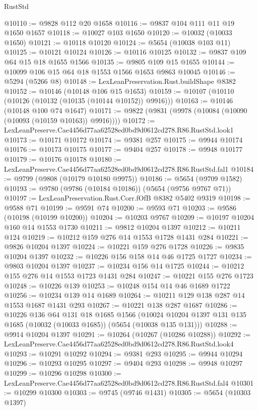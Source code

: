 \begin{lexlean}{RustStd}
\begin{coremodule}
@10110 := @9828 @112 @20 @1658
@10116 := @9837 @104 @111 @11 @19 @1650 @1657
@10118 := @10027 @103 @1650
@10120 := @10032 (@10033 @1650)
@10121 := @10118 @10120
@10124 := @5654 (@10038 @103 @11)
@10125 := @10121 @10124
@10126 := @10116 @10125
@10132 := @9837 @109 @64 @15 @18 @1655 @1566
@10135 := @9805 @109 @15 @1655
@10144 := @10099 @106 @15 @64 @18 @1553 @1566 @1653 @9863 @10045
@10146 := @5294 (@5266 @8)
@10148 := LexLeanPreservation.Rust.buildShape @8382
@10152 := @10146 (@10148 @106 @15 @1653)
@10159 := @10107 (@10110 (@10126 (@10132 (@10135 (@10144 @10152)) @9916)))
@10163 := @10146 (@10148 @100 @74 @1647)
@10171 := @9822 (@9831 (@9978 (@10084 (@10090 (@10093 (@10159 @10163)) @9916))))
@10172 := LexLeanPreserve.Cae4456d77aa62528ed0bd9d0612cd278.R86.RustStd.look1
@10173 := @10171 @10172
@10174 := @9381 @257
@10175 := @9944 @10174
@10176 := @10173 @10175
@10177 := @9404 @257
@10178 := @9948 @10177
@10179 := @10176 @10178
@10180 := LexLeanPreserve.Cae4456d77aa62528ed0bd9d0612cd278.R86.RustStd.fal1
@10184 := @9799 (@9808 (@10179 @10180 @9975))
@10186 := @5654 (@9709 @1582)
@10193 := @9780 (@9786 (@10184 @10186)) (@5654 (@9756 @9767 @71))
@10197 := LexLeanPreservation.Rust.Corr.fOfB @8382 @5402 @9319
@10198 := @9588 @71
@10199 := @9591 @74
@10200 := @9593 @71
@10203 := @9586 (@10198 (@10199 @10200))
@10204 := @10203 @9767
@10209 := @10197 @10204 @160 @14 @1553 @1730
@10211 := @9812 @10204 @1397
@10212 := @10211 @124
@10219 := @10212 @159 @276 @14 @1553 @1728 @1431 @284
@10221 := @9826 @10204 @1397
@10224 := @10221 @159 @276 @1728
@10226 := @9835 @10204 @1397
@10232 := @10226 @156 @158 @14 @46 @1725 @1727
@10234 := @9803 @10204 @1397
@10237 := @10234 @156 @14 @1725
@10244 := @10212 @155 @276 @14 @1553 @1723 @1431 @284
@10247 := @10221 @155 @276 @1723
@10248 := @10226 @139
@10253 := @10248 @154 @14 @46 @1689 @1722
@10256 := @10234 @139 @14 @1689
@10264 := @10211 @129 @138 @287 @14 @1553 @1687 @1431 @293
@10267 := @10221 @138 @287 @1687
@10286 := @10226
    @136
    @64
    @131
    @18
    @1685
    @1566
    (@10024 @10204 @1397 @131 @135 @1685 (@10032 (@10033 @1685)) (@5654 (@10038 @135 @131)))
@10288 := @9914 @10204 @1397
@10291 := @10264 (@10267 (@10286 @10288))
@10292 := LexLeanPreserve.Cae4456d77aa62528ed0bd9d0612cd278.R86.RustStd.look4
@10293 := @10291 @10292
@10294 := @9381 @293
@10295 := @9944 @10294
@10296 := @10293 @10295
@10297 := @9404 @293
@10298 := @9948 @10297
@10299 := @10296 @10298
@10300 := LexLeanPreserve.Cae4456d77aa62528ed0bd9d0612cd278.R86.RustStd.fal4
@10301 := @10299 @10300
@10303 := @9745 (@9746 @1431)
@10305 := @5654 (@10303 @1397)

\end{coremodule}
\end{lexlean}
